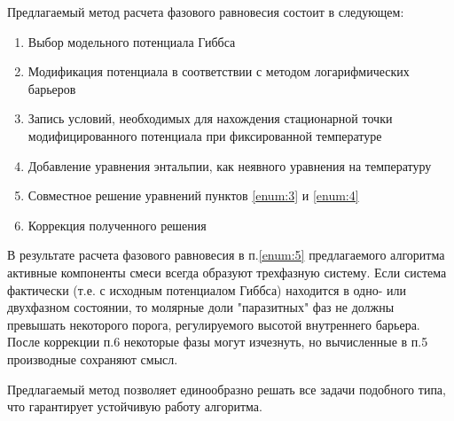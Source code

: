 \documentclass[12pt]{article}
\begin{document}
Предлагаемый метод расчета фазового равновесия состоит в следующем:
\begin{enumerate}
    \item Выбор модельного потенциала Гиббса
    \item Модификация потенциала в соответствии с методом логарифмических барьеров
    \item \label{enum:3} Запись условий, необходимых для нахождения стационарной точки модифицированного потенциала при фиксированной температуре
    \item \label{enum:4} Добавление уравнения энтальпии, как неявного уравнения на температуру
    \item \label{enum:5} Совместное решение уравнений пунктов \ref{enum:3} и \ref{enum:4}
    \item Коррекция полученного решения
\end{enumerate}

В результате расчета фазового равновесия в п.\ref{enum:5} предлагаемого алгоритма активные компоненты смеси всегда образуют трехфазную систему. Если система фактически (т.е. с исходным потенциалом Гиббса) находится в одно- или двухфазном состоянии, то молярные доли "паразитных" фаз не должны превышать некоторого порога, регулируемого высотой внутреннего барьера. После коррекции п.6 некоторые фазы могут изчезнуть, но вычисленные в п.5 производные сохраняют смысл.

Предлагаемый метод позволяет единообразно решать все задачи подобного типа, что гарантирует устойчивую работу алгоритма.
\end{document}
